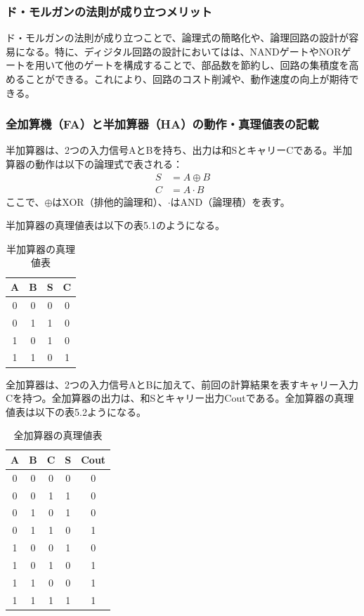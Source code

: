 \documentclass{jlreq}
\numberwithin{equation}{section}
\begin{document}
\subsubsection{ド・モルガンの法則が成り立つメリット}
ド・モルガンの法則が成り立つことで、論理式の簡略化や、論理回路の設計が容易になる。特に、ディジタル回路の設計においてはは、NANDゲートやNORゲートを用いて他のゲートを構成することで、部品数を節約し、回路の集積度を高めることができる。これにより、回路のコスト削減や、動作速度の向上が期待できる。

\subsubsection{全加算機（FA）と半加算器（HA）の動作・真理値表の記載}
半加算器は、2つの入力信号AとBを持ち、出力は和SとキャリーCである。半加算器の動作は以下の論理式で表される：
\begin{align}
  S &= A \oplus B \\
  C &= A \cdot B
\end{align}
ここで、\(\oplus\)はXOR（排他的論理和）、\(\cdot\)はAND（論理積）を表す。

半加算器の真理値表は以下の表5.1のようになる。
\begin{table}[H]
  \centering
  \caption{半加算器の真理値表}
  \begin{tabular}{|c|c|c|c|}
    \hline
    A & B & S & C \\ \hline
    0 & 0 & 0 & 0 \\ \hline
    0 & 1 & 1 & 0 \\ \hline
    1 & 0 & 1 & 0 \\ \hline
    1 & 1 & 0 & 1 \\ \hline
  \end{tabular}
\end{table}

全加算器は、2つの入力信号AとBに加えて、前回の計算結果を表すキャリー入力Cを持つ。全加算器の出力は、和Sとキャリー出力Coutである。全加算器の真理値表は以下の表5.2ようになる。
\begin{table}[H]
  \centering
  \caption{全加算器の真理値表}
  \begin{tabular}{|c|c|c|c|c|}
    \hline
    A & B & C & S & Cout \\ \hline
    0 & 0 & 0 & 0 & 0 \\ \hline
    0 & 0 & 1 & 1 & 0 \\ \hline
    0 & 1 & 0 & 1 & 0 \\ \hline
    0 & 1 & 1 & 0 & 1 \\ \hline
    1 & 0 & 0 & 1 & 0 \\ \hline
    1 & 0 & 1 & 0 & 1 \\ \hline
    1 & 1 & 0 & 0 & 1 \\ \hline
    1 & 1 & 1 & 1 & 1 \\ \hline
  \end{tabular}
\end{table}
\end{document}
